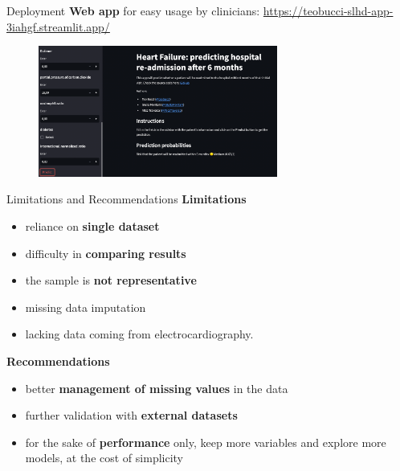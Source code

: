 \documentclass[aspectratio=169,xcolor=dvipsnames,handout]{beamer}
\begin{document}
\begin{frame}{Deployment}
    \textbf{Web app} for easy usage by clinicians:
    {\scriptsize\url{https://teobucci-slhd-app-3iahgf.streamlit.app/}}
    \begin{figure}[htpb]
        \centering
        \includegraphics[width=0.7\textwidth]{webapp}
    \end{figure}
\end{frame}



\begin{frame}{Limitations and Recommendations}
\textbf{Limitations}
\begin{itemize}
  \item reliance on \textbf{single dataset}
  \item difficulty in \textbf{comparing results}
  \item the sample is \textbf{not representative}
  \item missing data imputation
  \item lacking data coming from electrocardiography.
\end{itemize}
\pause
\textbf{Recommendations}
\begin{itemize}
  \item better \textbf{management of missing values} in the data
  \item further validation with \textbf{external datasets}
  \item for the sake of \textbf{performance} only, keep more variables and explore more models, at the cost of simplicity
\end{itemize}
\end{frame}
\end{document}
